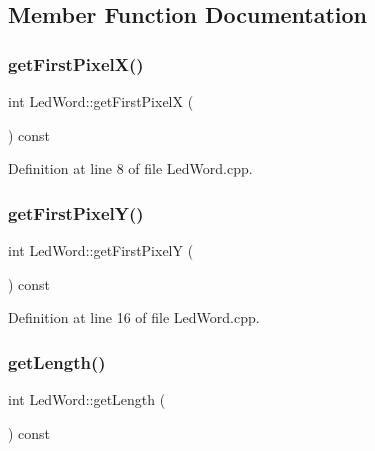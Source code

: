 \subsection{Member Function Documentation}
\mbox{\label{class_led_word_adb0caa32752f9d86c7a2b40baaf7b8b2}} 
\subsubsection{\texorpdfstring{getFirstPixelX()}{getFirstPixelX()}}
{\footnotesize\ttfamily int Led\+Word\+::get\+First\+PixelX (\begin{DoxyParamCaption}{ }\end{DoxyParamCaption}) const}



Definition at line 8 of file Led\+Word.\+cpp.

\mbox{\label{class_led_word_ab8c7b9c8e218b3b0f9aabfd2a0134679}} 
\subsubsection{\texorpdfstring{getFirstPixelY()}{getFirstPixelY()}}
{\footnotesize\ttfamily int Led\+Word\+::get\+First\+PixelY (\begin{DoxyParamCaption}{ }\end{DoxyParamCaption}) const}



Definition at line 16 of file Led\+Word.\+cpp.

\mbox{\label{class_led_word_a5c3b00f43585783fa56a4c2d2fc1eb41}} 
\subsubsection{\texorpdfstring{getLength()}{getLength()}}
{\footnotesize\ttfamily int Led\+Word\+::get\+Length (\begin{DoxyParamCaption}{ }\end{DoxyParamCaption}) const}



